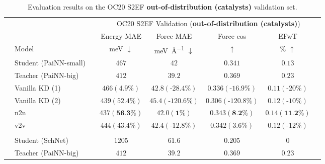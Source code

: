 \documentclass{article}
\begin{document}
\begin{table}[H]
\centering
\caption{Evaluation results on the OC20 S2EF \textbf{out-of-distribution (catalysts)} validation set.}
\begin{tabular}{llcccccc}
\multicolumn{1}{c}{\multirow{3}{*}{}} & & & \multicolumn{5}{c}{OC20 S2EF Validation (\textbf{out-of-distribution (catalysts)})} 
\\\cmidrule(r){4-7}
\multicolumn{1}{c}{}   &   &                   &      Energy MAE  &    Force MAE  & Force cos & EFwT \\
&   \multicolumn{1}{l}{Model}     &        &      \si{\milli\electronvolt} $\downarrow$   &    \si{\milli\electronvolt\per\angstrom} $\downarrow$     & $\uparrow$  & \% $\uparrow$ \\\cmidrule(r){1-7}
\parbox[t]{2mm}{} & Student (PaiNN-small)               &   &              $467$      &     $42$     &  $0.341$ &  $0.13$  \\
& Teacher (PaiNN-big)                  &   &              $412$        &   $39.2$     &   $0.369$      &   $0.23$    \\
& Vanilla KD (1)         &   &            $466 (4.9\%)$          &          $42.8 (\text{-}28.4\%)$     &     $0.336 (\text{-}16.9\%)$        &  $0.11 (\text{-}20\%)$   \\
& Vanilla KD (2)         &   &                $439 (52.4\%)$      &          $45.4 (\text{-}120.6\%)$     &     $0.306 (\text{-}120.8\%)$        &   $0.12 (\text{-}10\%)$ \\
& n2n              &   &             $437 (\textbf{56.3\%})$         &          $42.0 (\textbf{1\%})$     &     $0.343 (\textbf{8.2\%})$        & $0.14 (\textbf{11.2\%})$    \\
& v2v                &   &          $444 (43.4\%)$            &          $42.4 (\text{-}12.8\%)$     &     $0.342 (3.6\%)$        & $0.12 (\text{-}12\%)$    \\
 \\
\parbox[t]{2mm}{} & Student (SchNet)                  &   &              $1205$     &   $61.6$    &  $0.205$  &  $0$   \\
& Teacher (PaiNN-big)                  &   &              $412$        &   $39.2$     &   $0.369$      &   $0.23$    \\

\end{tabular}
\end{table}
\end{document}
